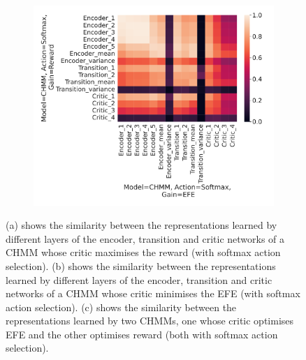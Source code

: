 \documentclass[twoside,11pt]{article}
\begin{document}
\begin{figure}[ht!]
\begin{subfigure}{.3\textwidth}
        \caption{}\label{sfig:cka-chmm2-chmm2-sm}
    \end{subfigure}%
    \begin{subfigure}{.3\textwidth}
        \centering
        \includegraphics[draft=false,width=\linewidth]{cka_figures/CKA_chmm_109_chmm_113}
        \caption{}\label{sfig:cka-chmm-chmm2-sm}
    \end{subfigure}

    \caption{(a) shows the similarity between the representations learned by different layers of the encoder, transition and critic networks of a CHMM whose critic maximises the reward (with softmax action selection). (b) shows the similarity between the representations learned by different layers of the encoder, transition and critic networks of a CHMM whose critic minimises the EFE (with softmax action selection). (c) shows the similarity between the representations learned by two CHMMs, one whose critic optimises EFE and the other optimises reward (both with softmax action selection).}
    \label{fig:cka-chmm-sm}
\end{figure}
\end{document}
